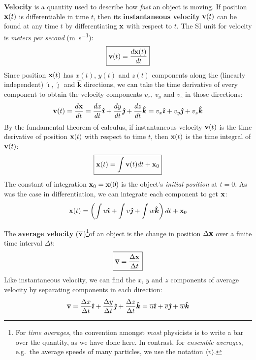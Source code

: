 \documentclass{../../../oss-handout}
\newcommand{\mb}[1]{\ensuremath\mathbf{#1}}
\begin{document}
\textbf{Velocity} is a quantity used to describe how \emph{fast} an object is
moving. If position $\mb{x}(t)$ is differentiable in time $t$, then its
\textbf{instantaneous velocity} $\mb{v}(t)$ can be found at any time $t$ by
differentiating $\mb{x}$ with respect to $t$. The SI unit for velocity is
\emph{meters per second} (\si{\metre\per\second}):
\begin{equation}
  \boxed{\mb{v}(t)= \frac{d\mb{x}(t)}{dt}}
\end{equation}
Since position $\mb{x}(t)$ has $x(t)$, $y(t)$ and $z(t)$ components along the
(linearly independent) $\bm{\hat{\imath}}$, $\bm{\hat{\jmath}}$ and
$\bm{\hat{k}}$ directions, we can take the time derivative of every component
to obtain the velocity components $v_x$, $v_y$ and $v_z$ in those directions:
\begin{equation*}
  \mb{v}(t)= \frac{d\mb{x}}{dt}=
  \frac{dx}{dt}\bm{\hat{\imath}} +
  \frac{dy}{dt}\bm{\hat{\jmath}} + \frac{dz}{dt}\bm{\hat{k}}=
  v_x\bm{\hat{\imath}} + v_y\bm{\hat{\jmath}} + v_z\bm{\hat{k}}
\end{equation*}
By the fundamental theorem of calculus, if instantaneous velocity $\mb{v}(t)$
is the time derivative of position $\mb{x}(t)$ with respect to time $t$, then
$\mb{x}(t)$ is the time integral of $\mb{v}(t)$:
\begin{equation}
  \boxed{\mb{x}(t)=\int\mb{v}(t)dt + \mb{x}_0}
\end{equation}
The constant of integration $\mb{x}_0=\mb{x}(0)$ is the object's
\emph{initial position} at $t=0$. As was the case in differentiation,
we can integrate each component to get $\mb{x}$:
\begin{equation*}
  \mb{x}(t)= \left(
  \int u\bm{\hat{\imath}} + \int v\bm{\hat{\jmath}} + \int w\bm{\hat{k}}
  \right) dt + \mb{x}_0
\end{equation*}


The \textbf{average velocity} ($\overline{\mb{v}}$)\footnote{For
  \emph{time averages}, the convention amongst \emph{most} physicists is to
  write a bar over the quantity, as we have done here. In contrast, for
  \emph{ensemble averages}, e.g.\ the average speeds of many particles, we use
  the notation $\langle v\rangle$. %
}of an object is the change in position $\Delta\mb{x}$ over a finite time
interval $\Delta t$:
\begin{equation}
  \boxed{\overline{\mb{v}}= \frac{\Delta\mb{x}}{\Delta t}}
\end{equation}
Like instantaneous velocity, we can find the $x$, $y$ and $z$ components of
average velocity by separating components in each direction:
\begin{equation*}
  \overline{\mb{v}}=
  \frac{\Delta x}{\Delta t}\bm{\hat{\imath}} +
  \frac{\Delta y}{\Delta t}\bm{\hat{\jmath}} +
  \frac{\Delta z}{\Delta t}\bm{\hat{k}} =
  \overline{u}\bm{\hat{\imath}} +
  \overline{v}\bm{\hat{\jmath}} +
  \overline{w}\bm{\hat{k}}
\end{equation*}
\end{document}
